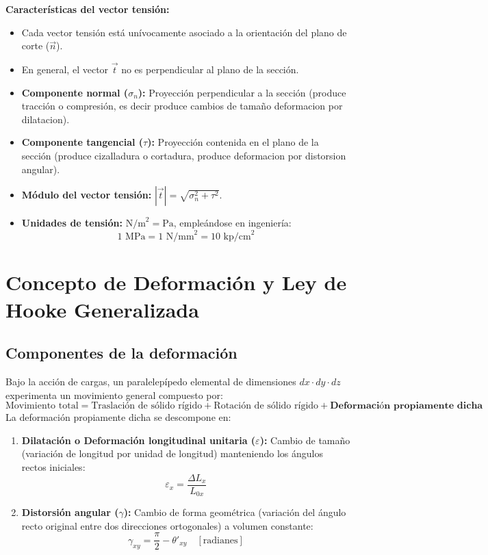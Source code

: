 \textbf{Características del vector tensión:}
\begin{itemize}
    \item Cada vector tensión está unívocamente asociado a la orientación del plano de corte ($\vec{n}$).
    \item En general, el vector $\vec{t}$ no es perpendicular al plano de la sección.
    \item \textbf{Componente normal ($\sigma_n$):} Proyección perpendicular a la sección (produce tracción o compresión, es decir produce cambios de tamaño deformacion por dilatacion).
    \item \textbf{Componente tangencial ($\tau$):} Proyección contenida en el plano de la sección (produce cizalladura o cortadura, produce deformacion por distorsion angular).
    \item \textbf{Módulo del vector tensión:} $|\vec{t}| = \sqrt{\sigma_n^2 + \tau^2}$.
    \item \textbf{Unidades de tensión:} $\text{N/m}^2 = \text{Pa}$, empleándose en ingeniería:
          \begin{equation}
              1\text{ MPa} = 1\text{ N/mm}^2 = 10\text{ kp/cm}^2
          \end{equation}
\end{itemize}

\section{Concepto de Deformación y Ley de Hooke Generalizada}

\subsection{Componentes de la deformación}
Bajo la acción de cargas, un paralelepípedo elemental de dimensiones $dx \cdot dy \cdot dz$ experimenta un movimiento general compuesto por:
\begin{equation}
    \text{Movimiento total} = \text{Traslación de sólido rígido} + \text{Rotación de sólido rígido} + \textbf{Deformación propiamente dicha}
\end{equation}
La deformación propiamente dicha se descompone en:
\begin{enumerate}
    \item \textbf{Dilatación o Deformación longitudinal unitaria ($\varepsilon$):} Cambio de tamaño (variación de longitud por unidad de longitud) manteniendo los ángulos rectos iniciales:
          \begin{equation}
              \varepsilon_x = \frac{\Delta L_x}{L_{0x}}
          \end{equation}
    \item \textbf{Distorsión angular ($\gamma$):} Cambio de forma geométrica (variación del ángulo recto original entre dos direcciones ortogonales) a volumen constante:
          \begin{equation}
              \gamma_{xy} = \frac{\pi}{2} - \theta'_{xy} \quad [\text{radianes}]
          \end{equation}
\end{enumerate}

